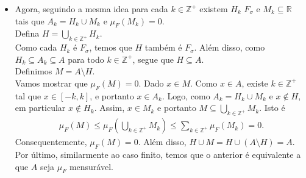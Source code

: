\begin{homeworkProblem}[1]
\begin{solution}
\begin{itemize}
    Similarmente ao caso finito, temos que o anterior é equivalente a que $A$ seja $\mu_F$ mensurável.\\
  \item Agora, seguindo a mesma idea para cada $k\in\mathbb{Z}^{+}$ existem $H_k$ $F_\sigma$ e $M_k\subseteq\mathbb{R}$ tais que $A_k=H_k\cup M_k$ e $\mu_F(M_k)=0$.\\
    Defina $H=\bigcup_{k\in\mathbb{Z}^{+}}H_k$.\\
    Como cada $H_k$ é $F_\sigma$, temos que $H$ também é $F_\sigma$. Além disso, como $H_k\subseteq A_k\subseteq A$ para todo $k\in\mathbb{Z}^{+}$, segue que $H\subseteq A$.\\
    Definimos $M=A\setminus H$.\\
    Vamos mostrar que $\mu_F(M)=0$. Dado $x\in M$. Como $x\in A$, existe $k\in\mathbb{Z}^{+}$ tal que $x\in[-k,k]$, e portanto $x\in A_k$. Logo, como $A_k=H_k\cup M_k$ e $x\notin H$, em particular $x\notin H_k$. Assim, $x\in M_k$ e portanto $M\subseteq\bigcup_{k\in\mathbb{Z}^{+}}M_k$. Isto é
    \begin{align*}
      \mu_F(M)\leq\mu_F\left(\bigcup_{k\in\mathbb{Z}^{+}}M_k\right)\leq\sum_{k\in\mathbb{Z}^{+}}\mu_F(M_k)=0.    
    \end{align*}
    Consequentemente, $\mu_F(M)=0$. Além disso, $H\cup M=H\cup(A\setminus H)=A$.\\
    Por último, similarmente ao caso finito, temos que o anterior é equivalente a que $A$ seja $\mu_F$ mensurável.
  \end{itemize}
  \end{solution}
\end{homeworkProblem}
